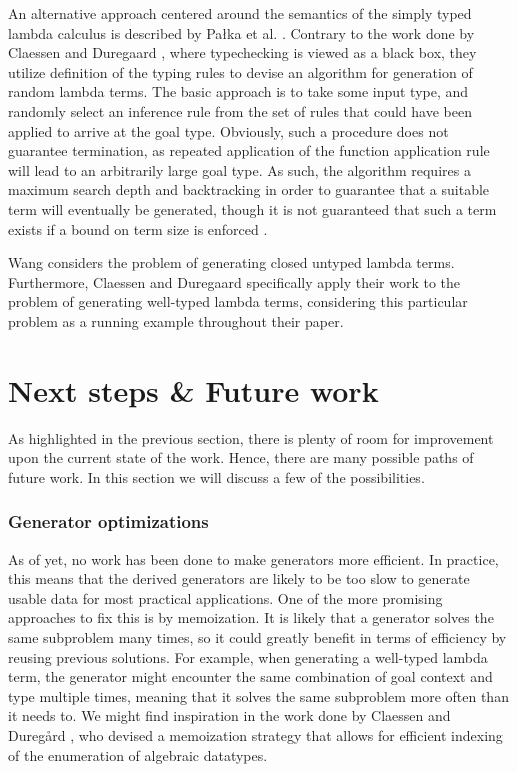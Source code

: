 \documentclass[a4paper,msc,twosized=semi]{uustthesis}
\begin{document}
  An alternative approach centered around the semantics of the simply typed lambda 
  calculus is described by Pa{\l}ka et al. \cite{palka2011testing}. Contrary to the 
  work done by Claessen and Duregaard \cite{claessen2015generating}, where 
  typechecking is viewed as a black box, they utilize definition of the typing rules 
  to devise an algorithm for generation of random lambda terms. The basic approach is 
  to take some input type, and randomly select an inference rule from the set of rules 
  that could have been applied to arrive at the goal type. Obviously, such a procedure 
  does not guarantee termination, as repeated application of the function application 
  rule will lead to an arbitrarily large goal type. As such, the algorithm requires a 
  maximum search depth and backtracking in order to guarantee that a suitable term 
  will eventually be generated, though it is not guaranteed that such a term exists if 
  a bound on term size is enforced \cite{moczurad2000statistical}. 

  Wang \cite{wang2005generating} considers the problem of generating closed untyped 
  lambda terms. Furthermore, Claessen and Duregaard \cite{claessen2015generating} 
  specifically apply their work to the problem of generating well-typed lambda terms, 
  considering this particular problem as a running example throughout their paper.  

\section{Next steps \& Future work}

  As highlighted in the previous section, there is plenty of room for improvement upon 
  the current state of the work. Hence, there are many possible paths of future work. 
  In this section we will discuss a few of the possibilities. 

\subsubsection{Generator optimizations}

  As of yet, no work has been done to make generators more efficient. In practice, 
  this means that the derived generators are likely to be too slow to generate usable 
  data for most practical applications. One of the more promising approaches to fix 
  this is by memoization. It is likely that a generator solves the same subproblem 
  many times, so it could greatly benefit in terms of efficiency by reusing previous 
  solutions. For example, when generating a well-typed lambda term, the generator 
  might encounter the same combination of goal context and type multiple times, 
  meaning that it solves the same subproblem more often than it needs to. We might 
  find inspiration in the work done by Claessen and Dureg{\aa}rd \cite
  {duregaard2013feat}, who devised a memoization strategy that allows for efficient 
  indexing of the enumeration of algebraic datatypes. 
\end{document}
